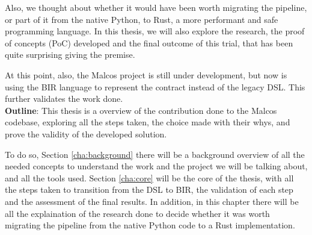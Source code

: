 Also, we thought about whether it would have been worth migrating the pipeline, or
part of it from the native Python, to Rust, a more performant and safe programming
language. In this thesis, we will also explore the research, the proof of
concepts (PoC) developed and the final outcome of this trial, that has been quite
surprising giving the premise.

At this point, also, the Malcos project is still under development, but now is
using the BIR language to represent the contract instead of the legacy DSL. This
further validates the work done. \\

\textbf{Outline}: This thesis is a overview of the contribution done to the Malcos
codebase, exploring all the steps taken, the choice made with their whys, and
prove the validity of the developed solution.

To do so, Section \ref{cha:background} there will be a background overview of all
the needed concepts to understand the work and the project we will be talking about,
and all the tools used. Section \ref{cha:core} will be the core of the thesis,
with all the steps taken to transition from the DSL to BIR, the validation of each
step and the assessment of the final results. In addition, in this chapter there
will be all the explaination of the research done to decide whether it was worth
migrating the pipeline from the native Python code to a Rust implementation.